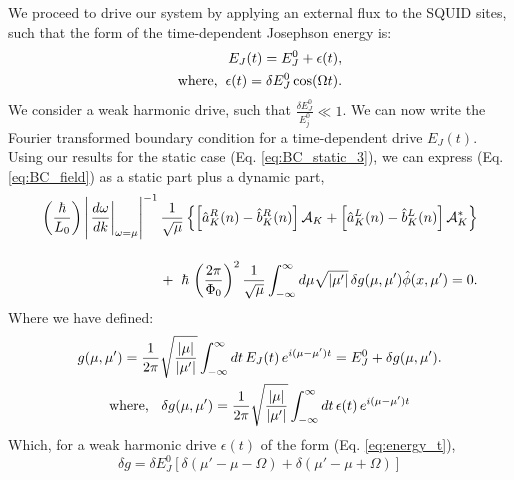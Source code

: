 We proceed to drive our system by applying an external flux to the SQUID sites, such that the form of the time-dependent Josephson energy is:
%
\begin{equation}\label{eq:energy_t}
\begin{split}
    E_J(t) = E^0_J + \epsilon(t),
    \\
    \text{where,} \hspace{2mm}
    \epsilon(t) = \delta E^0_J \cos(\Omega t). 
\end{split}
\end{equation}
%
We consider a weak harmonic drive, such that $\frac{\delta E^0_J}{E^0_j} \ll 1$. We can now write the Fourier transformed boundary condition for a time-dependent drive $E_J(t)$. Using our results for the static case (Eq. \ref{eq:BC_static_3}), we can express (Eq. \ref{eq:BC_field}) as a static part plus a dynamic part,
%
\begin{equation}\label{eq:BC_harmonic_drive}
\begin{split}
    \left(\frac{\hbar}{L_0}\right)
    \left|\left.\frac{d\omega}{dk}\right|_{\omega=\mu}\right|^{-1}
    \frac{1}{\sqrt{\mu}}
    \left\lbrace
    \left[\hat{a}^R_K(n) - \hat{b}_K^R(n)\right] \mathcal{A}_K +
    \left[\hat{a}^L_K(n) - \hat{b}^L_K(n)\right]\mathcal{A}^*_K
    \right\rbrace
    \\[4mm]
    +\hspace{2mm}
    \hbar \, \left(\frac{2\pi}{\Phi_0}\right)^2
    \frac{1}{\sqrt{\mu}}
    \int_{-\infty}^{\infty} d \mu
    \sqrt{\left| \mu' \right|}\,
    \delta g(\mu, \mu')
    \hat{\phi}(x, \mu') = 0.
\end{split}
\end{equation}
%
Where we have defined:
\begin{gather}\label{eq:Energy_FT}
    g(\mu, \mu') = \frac{1}{2 \pi} \sqrt{\frac{|\mu|}{|\mu'|}}
    \int_{-\infty}^{\infty} dt \, E_J(t) \, e^{i(\mu - \mu')t}
    = E_J^0 + \delta g(\mu, \mu').
    \\
    \text{where, }\hspace{2mm}\delta g(\mu, \mu') = \frac{1}{2 \pi} \sqrt{\frac{|\mu|}{|\mu'|}}
    \int_{-\infty}^{\infty} dt \, \epsilon(t) \, e^{i(\mu - \mu')t}
\end{gather}
%
Which, for a weak harmonic drive $\epsilon(t)$ of the form (Eq. \ref{eq:energy_t}),
%
\begin{equation}
    \delta g = \delta E_J^0
    \left[
    \delta (\mu' - \mu - \Omega) +
    \delta(\mu' - \mu + \Omega)
    \right]
\end{equation}
